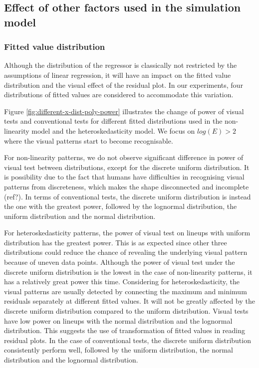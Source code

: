 \documentclass[]{interact}
\theoremstyle{plain}%
\theoremstyle{definition}
\theoremstyle{remark}
\begin{document}
\hypertarget{effect-of-other-factors-used-in-the-simulation-model}{%
\subsection{Effect of other factors used in the simulation
model}\label{effect-of-other-factors-used-in-the-simulation-model}}

\hypertarget{fitted-value-distribution}{%
\subsubsection{Fitted value
distribution}\label{fitted-value-distribution}}

Although the distribution of the regressor is classically not restricted
by the assumptions of linear regression, it will have an impact on the
fitted value distribution and the visual effect of the residual plot. In
our experiments, four distributions of fitted values are considered to
accommodate this variation.

Figure \ref{fig:different-x-dist-poly-power} illustrates the change of
power of visual tests and conventional tests for different fitted
distributions used in the non-linearity model and the heteroskedasticity
model. We focus on \(log(E) > 2\) where the visual patterns start to
become recognisable.

For non-linearity patterns, we do not observe significant difference in
power of visual test between distributions, except for the discrete
uniform distribution. It is possibility due to the fact that humans have
difficulties in recognising visual patterns from discreteness, which
makes the shape disconnected and incomplete (ref?). In terms of
conventional tests, the discrete uniform distribution is instead the one
with the greatest power, followed by the lognormal distribution, the
uniform distribution and the normal distribution.

For heteroskedasticity patterns, the power of visual test on lineups
with uniform distribution has the greatest power. This is as expected
since other three distributions could reduce the chance of revealing the
underlying visual pattern because of uneven data points. Although the
power of visual test under the discrete uniform distribution is the
lowest in the case of non-linearity patterns, it has a relatively great
power this time. Considering for heteroskedasticity, the visual patterns
are usually detected by connecting the maximum and minimum residuals
separately at different fitted values. It will not be greatly affected
by the discrete uniform distribution compared to the uniform
distribution. Visual tests have low power on lineups with the normal
distribution and the lognormal distribution. This suggests the use of
transformation of fitted values in reading residual plots. In the case
of conventional tests, the discrete uniform distribution consistently
perform well, followed by the uniform distribution, the normal
distribution and the lognormal distribution.
\end{document}
